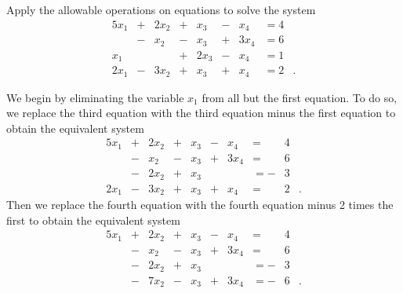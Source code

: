 
\ExampleIntro

\begin{example} Apply the allowable operations on equations to solve the system
\begin{alignat*}{5}
{}x_1	 	&{}+{}	&{2}x_2 	&{+}	&{}x_3	&{-}	&{}x_4	&= 4&{}   \\
{}	 	&{}-{}	&{}x_2 	&{-}	&{}x_3	&{+}	&{3}x_4	&= 6&{}   \\
{}x_1 	&{}{}		&{}	 	&{+}	&{2}x_3	&{-}	&{}x_4	&= 1&{}   \\
{2}x_1	 &{}-{}	&{3}x_2 	&{+}	&{}x_3	&{+}	&{}x_4	&= 2&{.}   
\end{alignat*}

\ExampleSolution We begin by eliminating the variable $x_1$ from all but the first equation. To do so, we replace the third equation with the third equation minus the first equation to obtain the equivalent system
\begin{alignat*}{5}
{}x_1	 	&{}+{}	&{2}x_2 	&{+}		&{}x_3	&{-}	&{}x_4	&= {}&4&{}   \\
{}	 	&{}-{}	&{}x_2 	&{-}		&{}x_3	&{+}	&{3}x_4	&= {}&6&{}   \\
{}	 	&{}-{}	&{2}x_2	 &{+}		&{}x_3	&{}	&{}		&= {-}&3&{}   \\
{2}x_1	 &{}-{}	&{3}x_2 	&{+}		&{}x_3	&{+}	&{}x_4	&= {}&2&{.}   
\end{alignat*}
Then we replace the fourth equation with the fourth equation minus 2 times the first to obtain the equivalent system
\begin{alignat*}{5}
{}x_1	 	&{}+{}	&{2}x_2 	&{+}		&{}x_3	&{-}	&{}x_4	&= {}&4&{}   \\
{}	 	&{}-{}	&{}x_2 	&{-}		&{}x_3	&{+}	&{3}x_4	&= {}&6&{}   \\
{}	 	&{}-{}	&{2}x_2	 &{+}		&{}x_3	&{}	&{}		&= {-}&3&{}   \\
{}	 	&{}-{}	&{7}x_2 	&{-}		&{}x_3	&{+}	&{3}x_4	&= {-}&6&{.}   
\end{alignat*}


\end{example}
